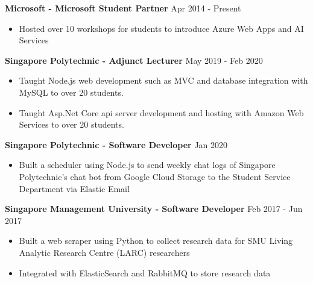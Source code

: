 \documentclass[11pt]{article} %
\begin{document}
\medskip

\textbf{Microsoft - Microsoft Student Partner} \hfill Apr 2014 - Present

\smallskip
\begin{itemize}

    \item Hosted over 10 workshops for students to introduce Azure Web Apps and AI Services

\end{itemize}

\medskip

\textbf{Singapore Polytechnic - Adjunct Lecturer} \hfill May 2019 - Feb 2020

\smallskip
\begin{itemize}

    \item Taught Node.js web development such as MVC and database integration with MySQL to over 20 students.
    \item Taught Asp.Net Core api server development and hosting with Amazon Web Services to over 20 students.

\end{itemize}

\medskip

\textbf{Singapore Polytechnic - Software Developer} \hfill Jan 2020

\smallskip
\begin{itemize}

    \item Built a scheduler using Node.js to send weekly chat logs of Singapore Polytechnic's chat bot from Google Cloud Storage to the Student Service Department via Elastic Email

\end{itemize}

\medskip

\textbf{Singapore Management University - Software Developer} \hfill Feb 2017 - Jun 2017

\smallskip
\begin{itemize}

    \item Built a web scraper using Python to collect research data for SMU Living Analytic Research Centre (LARC) researchers
    \item Integrated with ElasticSearch and RabbitMQ to store research data

\end{itemize}

\medskip
\end{document}
